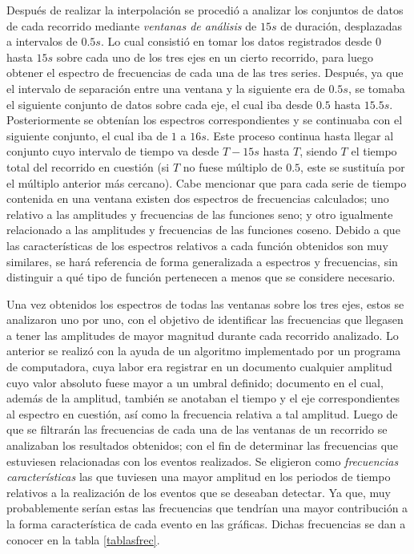 Después de realizar la interpolación se procedió a analizar los conjuntos de datos de cada recorrido mediante {\em ventanas de análisis} de $15s$ de duración, desplazadas a intervalos de $0.5s$. 
Lo cual consistió en tomar los datos registrados desde $0$ hasta $15s$ sobre cada uno de los tres ejes en un cierto recorrido, para luego obtener el espectro de frecuencias de cada una de las tres series. 
Después, ya que el intervalo de separación entre una ventana y la siguiente era de $0.5s$, se tomaba el siguiente conjunto de datos sobre cada eje, el cual iba desde $0.5$ hasta $15.5s$. Posteriormente se obtenían los espectros correspondientes y se continuaba con el siguiente conjunto, el cual iba de $1$ a $16s$. 
Este proceso continua hasta llegar al conjunto cuyo intervalo de tiempo va desde $T-15s$ hasta $T$, siendo $T$ el tiempo total del recorrido en cuestión (si $T$ no fuese múltiplo de $0.5$, este se sustituía por el múltiplo anterior más cercano).
Cabe mencionar que para cada serie de tiempo contenida en una ventana existen dos espectros de frecuencias calculados; uno relativo a las amplitudes y frecuencias de las funciones seno; y otro igualmente relacionado a las amplitudes y frecuencias de las funciones coseno.
Debido a que las características de los espectros relativos a cada función obtenidos son muy similares, se hará referencia de forma generalizada a espectros y frecuencias, sin distinguir a qué tipo de función pertenecen a menos que se considere necesario. 

Una vez obtenidos los espectros de todas las ventanas sobre los tres ejes, estos se analizaron uno por uno, con el objetivo de identificar las frecuencias que llegasen a tener las amplitudes de mayor magnitud durante cada recorrido analizado.
Lo anterior se realizó con la ayuda de un algoritmo implementado por un programa de computadora, cuya labor era registrar en un documento cualquier amplitud cuyo valor absoluto fuese mayor a un umbral definido; documento en el cual, además de la amplitud, también se anotaban el tiempo y el eje correspondientes al espectro en cuestión, así como la frecuencia relativa a tal amplitud.
Luego de que se filtrarán las frecuencias de cada una de las ventanas de un recorrido se analizaban los resultados obtenidos; con el fin de determinar las frecuencias que estuviesen relacionadas con los eventos realizados. 
Se eligieron como {\em frecuencias características} las que tuviesen una mayor amplitud en los periodos de tiempo relativos a la realización de los eventos que se deseaban detectar. 
Ya que, muy probablemente serían estas las frecuencias que tendrían una mayor contribución a la forma característica de cada evento en las gráficas.
Dichas frecuencias se dan a conocer en la tabla \ref{tablasfrec}.\\

